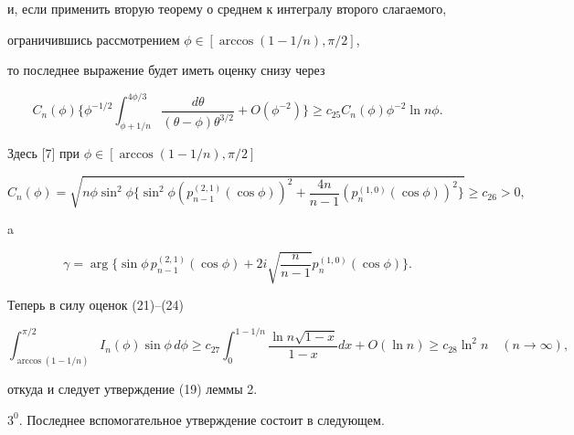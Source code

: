 и, если применить вторую теорему о среднем к интегралу второго слагаемого,


ограничившись рассмотрением $\phi \in [\arccos(1-1/n),{\pi}/{2}]$,


то последнее выражение будет иметь оценку снизу через


\begin{equation}


C_n (\phi)\bigg\{\phi^{-{1}/{2}}\int_{\phi +1/n}^{{4\phi}/{3}}


\frac{d\theta}{(\theta-\phi)\theta^{{3}/{2}}}+O(\phi^{-2})\bigg\}\ge


c_{25} C_n (\phi) \phi^{-2}\ln n\phi.


\end{equation}


Здесь [7] при $ \phi \in [\arccos(1-1/n),{\pi}/{2}]$


$$


C_n(\phi)=\sqrt {n\phi \sin^2 \phi


\Big\{\sin^2\phi (p_{n-1}^{(2,1)}


(\cos \phi))^2+\dfrac{4n}{n-1}(p_n^{(1,0)} (\cos \phi ))^2\Big\}}\ge


c_{26} >0,


$$


a


$$


\gamma =\arg\bigg \{\sin \phi\, p_{n-1}^{(2,1)}(\cos \phi) + 2 i


\sqrt{\frac{n}{n-1}}p_{n}^{(1,0)} (\cos \phi)\bigg\}.


$$


Теперь в силу оценок (21)--(24)


$$


\int_{\arccos(1-{1}/{n})}^{{\pi}/{2}}


I_n(\phi)\sin \phi\,d\phi


\ge c_{27} \int^{1-{1}/{n}}_0 \frac{\ln n\sqrt{1-x}}{1-x} dx +


O(\ln n) \ge c_{28} \ln^2 n \quad (n\to \infty),


$$


откуда и следует утверждение (19) леммы 2.


\medskip





$3^0$. Последнее вспомогательное утверждение состоит в следующем.


\medskip


\addtocounter{lem}{1}





